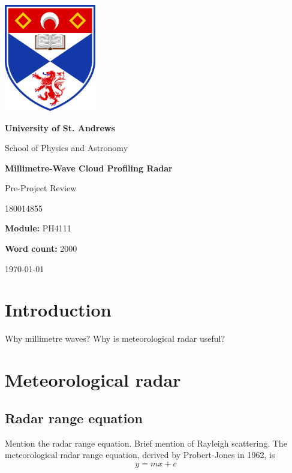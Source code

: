 \documentclass{article}
\title {\mytitle}
\author{\myauthor}
\date  {\mydate}
\newcommand\mytitle    {Millimetre-Wave Cloud Profiling Radar}
\newcommand\mysubtitle {Pre-Project Review}
\newcommand\myauthor   {180014855}
\newcommand\mymodule   {PH4111}
\newcommand\mywordcount{2000}
\begin{document}
\begin{titlepage}
	\centering
	{\includegraphics[width=0.3\textwidth]{uos-logo}}
	\par
	{\LARGE\bfseries University of St. Andrews\par}
	{\LARGE School of Physics and Astronomy\par}
	\vspace{1.5cm}
	{\huge\bfseries\mytitle\par}
	{\Large\mysubtitle\par}
	\vspace{2cm}
	{\Large\myauthor\par}
	{\large\textbf{Module:} \mymodule\par}
	{\large\textbf{Word count:} \mywordcount\par}
	\vfill
	{\large\today\par}
\end{titlepage}

\begin{abstract}
This work is about \dots
\end{abstract}

\section{Introduction} \label{sec:Introduction}
Why millimetre waves?
Why is meteorological radar useful?

\section{Meteorological radar}
\subsection{Radar range equation}
Mention the radar range equation.
Brief mention of Rayleigh scattering.
The meteorological radar range equation, derived by Probert-Jones in 1962, is\supercite{ProbertJones}
\begin{equation}
	y = m x + c\label{eqn:MeteoRange}
\end{equation}
\end{document}
